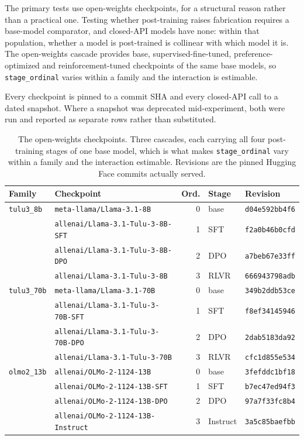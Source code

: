 The primary tests use open-weights checkpoints, for a structural reason rather
than a practical one. Testing whether post-training raises fabrication requires
a base-model comparator, and closed-API models have none: within that
population, whether a model is post-trained is collinear with which model it is.
The open-weights cascade provides base, supervised-fine-tuned,
preference-optimized and reinforcement-tuned checkpoints of the same base
models, so \texttt{stage\_ordinal} varies within a family and the interaction is
estimable.

Every checkpoint is pinned to a commit SHA and every closed-API call to a dated
snapshot. Where a snapshot was deprecated mid-experiment, both were run and
reported as separate rows rather than substituted.

\begin{table}[htbp]
\centering
\small
\caption{The open-weights checkpoints. Three cascades, each carrying all four
post-training stages of one base model, which is what makes
\texttt{stage\_ordinal} vary within a family and the interaction estimable.
Revisions are the pinned Hugging Face commits actually served.}
\label{tab:models}
\begin{tabular}{@{}l l r l l@{}}
\toprule
Family & Checkpoint & Ord. & Stage & Revision \\
\midrule
\texttt{tulu3\_8b}  & \texttt{meta-llama/Llama-3.1-8B}              & 0 & base     & \texttt{d04e592bb4f6} \\
                    & \texttt{allenai/Llama-3.1-Tulu-3-8B-SFT}      & 1 & SFT      & \texttt{f2a0b46b0cfd} \\
                    & \texttt{allenai/Llama-3.1-Tulu-3-8B-DPO}      & 2 & DPO      & \texttt{a7beb67e33ff} \\
                    & \texttt{allenai/Llama-3.1-Tulu-3-8B}          & 3 & RLVR     & \texttt{666943798adb} \\
\midrule
\texttt{tulu3\_70b} & \texttt{meta-llama/Llama-3.1-70B}             & 0 & base     & \texttt{349b2ddb53ce} \\
                    & \texttt{allenai/Llama-3.1-Tulu-3-70B-SFT}     & 1 & SFT      & \texttt{f8ef34145946} \\
                    & \texttt{allenai/Llama-3.1-Tulu-3-70B-DPO}     & 2 & DPO      & \texttt{2dab5183da92} \\
                    & \texttt{allenai/Llama-3.1-Tulu-3-70B}         & 3 & RLVR     & \texttt{cfc1d855e534} \\
\midrule
\texttt{olmo2\_13b} & \texttt{allenai/OLMo-2-1124-13B}              & 0 & base     & \texttt{3fefddc1bf18} \\
                    & \texttt{allenai/OLMo-2-1124-13B-SFT}          & 1 & SFT      & \texttt{b7ec47ed94f3} \\
                    & \texttt{allenai/OLMo-2-1124-13B-DPO}          & 2 & DPO      & \texttt{97a7f33fc8b4} \\
                    & \texttt{allenai/OLMo-2-1124-13B-Instruct}     & 3 & Instruct & \texttt{3a5c85baefbb} \\
\bottomrule
\end{tabular}
\end{table}

